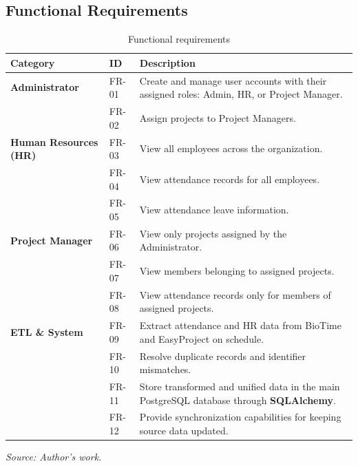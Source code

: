 \subsection{Functional Requirements}
\begin{table}[H]
	\centering
	\renewcommand{\arraystretch}{1.25}
	\setlength{\tabcolsep}{6pt}
	\begin{tabular}{|>{\raggedright\arraybackslash}p{3.3cm}|>{\centering\arraybackslash}p{2.1cm}|>{\raggedright\arraybackslash}p{8.8cm}|}
		\hline
		\rowcolor{gray!20}
		\textbf{Category} & \textbf{ID} & \textbf{Description} \\
		\hline
		\textbf{Administrator} & FR-01 & Create and manage user accounts with their assigned roles: Admin, HR, or Project Manager. \\
		\cline{2-3}
		& FR-02 & Assign projects to Project Managers. \\
		\hline
		\textbf{Human Resources (HR)} & FR-03 & View all employees across the organization. \\
		\cline{2-3}
		& FR-04 & View attendance records for all employees. \\
		\cline{2-3}
		& FR-05 & View attendance leave information. \\
		\hline
		\textbf{Project Manager} & FR-06 & View only projects assigned by the Administrator. \\
		\cline{2-3}
		& FR-07 & View members belonging to assigned projects. \\
		\cline{2-3}
		& FR-08 & View attendance records only for members of assigned projects. \\
		\hline
		\textbf{ETL \& System} & FR-09 & Extract attendance and HR data from BioTime and EasyProject on schedule. \\
		\cline{2-3}
		& FR-10 & Resolve duplicate records and identifier mismatches. \\
		\cline{2-3}
		& FR-11 & Store transformed and unified data in the main PostgreSQL database through \textbf{SQLAlchemy}. \\
		\cline{2-3}
		& FR-12 & Provide synchronization capabilities for keeping source data updated. \\
		\hline
	\end{tabular}
	\caption{Functional requirements}
	\label{tab:functional-requirements}
	{\footnotesize\textit{Source: Author's work.}}
\end{table}

